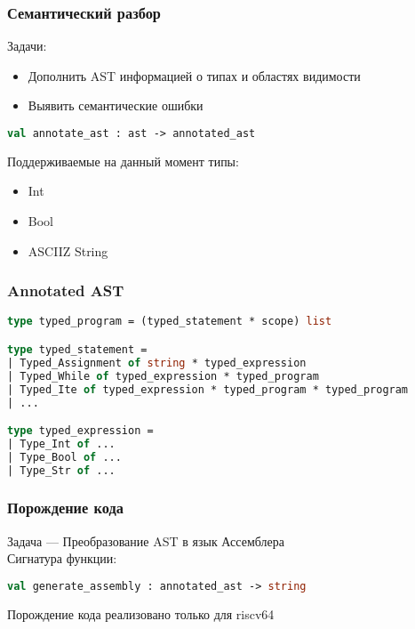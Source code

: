 \documentclass{beamer}
\begin{document}
		\begin{frame}[fragile]
		\frametitle{Семантический разбор}
		Задачи:
		\begin{itemize}
			\item Дополнить AST информацией о типах и областях видимости
			\item Выявить семантические ошибки
		\end{itemize}
				
		\begin{lstlisting}[language=ML] 
		val annotate_ast : ast -> annotated_ast
		\end{lstlisting}
		
		Поддерживаемые на данный момент типы:
		\begin{itemize}
			\item Int
			\item Bool
			\item ASCIIZ String
		\end{itemize}

		\end{frame}
	\begin{frame}[fragile]
			\frametitle{Annotated AST}

\begin{lstlisting}[language=ML] 
type typed_program = (typed_statement * scope) list

type typed_statement =
| Typed_Assignment of string * typed_expression
| Typed_While of typed_expression * typed_program
| Typed_Ite of typed_expression * typed_program * typed_program
| ...

type typed_expression =
| Type_Int of ...
| Type_Bool of ...
| Type_Str of ...

\end{lstlisting}

		\end{frame}

\begin{frame}[fragile]
	\frametitle{Порождение кода}
	Задача — Преобразование AST в язык Ассемблера
	\\
	Сигнатура функции:
	\begin{lstlisting}[language=ML] 
	val generate_assembly : annotated_ast -> string
	\end{lstlisting}
	
	Порождение кода реализовано только для riscv64
\end{frame}
\end{document}
